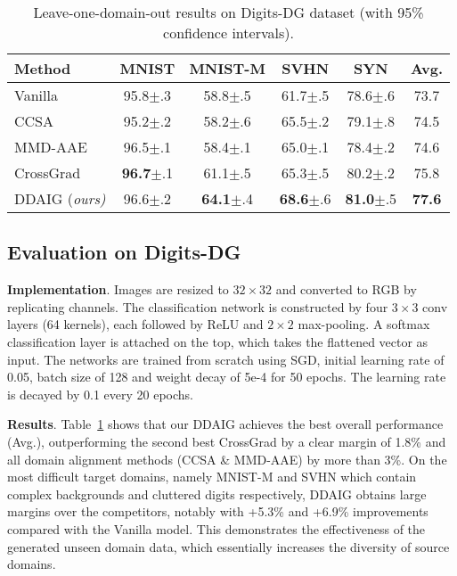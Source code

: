 \documentclass[letterpaper]{article}
\newcommand{\keypoint}[1]{\vspace{0.1cm}\noindent\textbf{#1}}
\newcommand{\tableCellHeight}{1.1}
\begin{document}
\begin{table}[t]
\setlength{\tabcolsep}{3pt}
\renewcommand{\arraystretch}{\tableCellHeight}
\centering
\footnotesize
\caption{Leave-one-domain-out results on Digits-DG dataset (with 95\% confidence intervals).}
\label{tab:resOnDigitsDG}
\begin{tabular}{l | c c c c | c}
\hline
Method & MNIST & MNIST-M & SVHN & SYN & Avg. \\ \hline
Vanilla & 95.8$\pm$.3 & 58.8$\pm$.5 & 61.7$\pm$.5 & 78.6$\pm$.6 & 73.7 \\
CCSA & 95.2$\pm$.2 & 58.2$\pm$.6 & {65.5}$\pm$.2 & 79.1$\pm$.8 & 74.5 \\
MMD-AAE & 96.5$\pm$.1 & 58.4$\pm$.1 & 65.0$\pm$.1 & 78.4$\pm$.2 & 74.6 \\
CrossGrad & \textbf{96.7}$\pm$.1 & {61.1}$\pm$.5 & 65.3$\pm$.5 & {80.2}$\pm$.2 & {75.8} \\
DDAIG (\emph{ours)} & {96.6}$\pm$.2 & \textbf{64.1}$\pm$.4 & \textbf{68.6}$\pm$.6 & \textbf{81.0}$\pm$.5 & \textbf{77.6} \\
\hline
\end{tabular}
\vspace{-0.3cm}
\end{table}


\subsection{Evaluation on Digits-DG}
\keypoint{Implementation}.
Images are resized to $32\times32$ and converted to RGB by replicating channels.
The classification network is constructed by four $3 \times 3$ conv layers (64 kernels), each followed by ReLU and $2 \times 2$ max-pooling. A softmax classification layer is attached on the top, which takes the flattened vector as input.
The networks are trained from scratch using SGD, initial learning rate of 0.05, batch size of 128 and weight decay of 5e-4 for 50 epochs. The learning rate is decayed by 0.1 every 20 epochs.

\keypoint{Results}.
Table~\ref{tab:resOnDigitsDG} shows that our DDAIG achieves the best overall performance (Avg.), outperforming the second best CrossGrad by a clear margin of 1.8\% and all domain alignment methods (CCSA \& MMD-AAE) by more than 3\%. On the most difficult target domains, namely MNIST-M and SVHN which contain complex backgrounds and cluttered digits respectively, DDAIG obtains large margins over the competitors, notably with +5.3\% and +6.9\% improvements compared with the Vanilla model. This demonstrates the effectiveness of the generated unseen domain data, which essentially increases the diversity of source domains.
\end{document}
